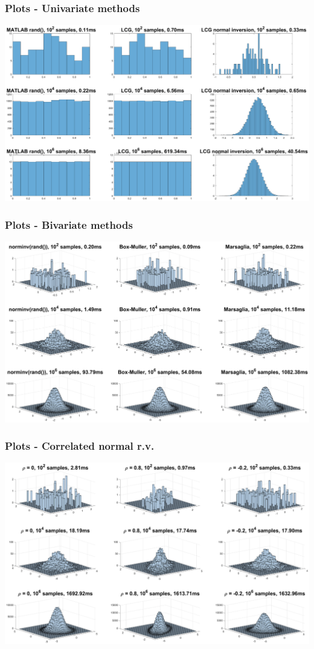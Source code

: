 \documentclass[10pt, serif, mathserif]{beamer}
\begin{document}
\begin{frame}
	\frametitle{Plots - Univariate methods}
	\centering \includegraphics[width=.9\textwidth, trim=100mm 100mm 70mm 70mm]{../univariate.eps}
\end{frame}

\begin{frame}
	\frametitle{Plots - Bivariate methods}
	\centering \includegraphics[width=.9\textwidth, trim=100mm 100mm 70mm 70mm]{../bivariate.eps}
\end{frame}

\begin{frame}
	\frametitle{Plots - Correlated normal r.v.}
	\centering \includegraphics[width=.9\textwidth, trim=100mm 100mm 70mm 70mm]{../correlated.eps}
\end{frame}
\end{document}
